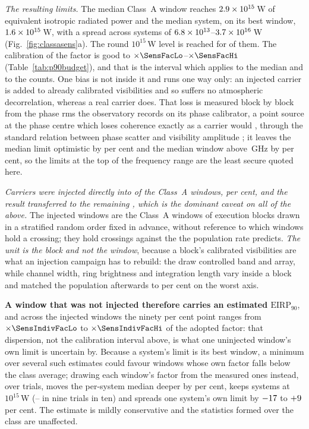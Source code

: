 \emph{The resulting limits.} The median Class~A window reaches
$2.9\times10^{15}$\,W of equivalent isotropic radiated power and the median
system, on its best window, $1.6\times10^{15}$\,W, with a spread across
systems of $6.8\times10^{13}$--$3.7\times10^{16}$\,W
(Fig.~\ref{fig:classasens}a). The round $10^{15}$\,W level is reached for
\NSysEfifteen{} of them. The calibration of the factor is good to
$\times\SensFacLo$--$\times\SensFacHi$ (Table~\ref{tab:p90budget}), and that
is the interval which applies to the median and to the counts. One bias is
not inside it and runs one way only: an injected carrier is added to already calibrated visibilities
and so suffers no atmospheric decorrelation, whereas a real carrier does. That
loss is measured block by block from the phase rms the observatory records on
its phase calibrator, a point source at the phase centre which loses coherence
exactly as a carrier would \citep[\S10.4.9]{ALMAHandbook}, through the standard
relation between phase scatter and visibility amplitude
\citep[Eq.~3]{Richards2022};
it leaves the median limit optimistic by \SensDecorPct{} per cent and the
median window above \SensDecorHiGHz{}\,GHz by \SensDecorHiPct{} per cent, so
the limits at the top of the frequency range are the least secure quoted here.

\emph{Carriers were injected directly into \SensNInj{} of the \NWinA{}
Class~A windows, \SensNInjPct{} per cent, and the result transferred to the
remaining \SensNTransfer, which is the dominant caveat on all of the above.}
The injected windows are the Class~A windows of execution blocks drawn in a
stratified random order fixed in advance, without reference to which windows
hold a crossing; they hold \SensNCrossAch{} crossings against the
\SensNCrossExp{} the population rate predicts. \emph{The unit is the block
and not the window}, because a block's calibrated visibilities are what an
injection campaign has to rebuild: the draw controlled band and array, while
channel width, ring brightness and integration length vary inside a block and
matched the population afterwards to \SensCovWorstPct{} per cent on the worst
axis.

\textbf{A window that was not injected therefore carries an estimated
$\mathrm{EIRP}_{90}$}, and across the injected windows the ninety per cent
point ranges from $\times\SensIndivFacLo$ to $\times\SensIndivFacHi$ of the
adopted factor: that dispersion, not the calibration interval above, is what
one uninjected window's own limit is uncertain by. Because a system's limit is
its best window, a minimum over several such estimates could favour windows
whose own factor falls below the class average; drawing each window's factor
from the \SensNInj{} measured ones instead, over \ScRsNTrial{} trials, moves
the per-system median deeper by \ScRsMedShiftPct{} per cent, keeps
\NSysEfifteen{} systems at $10^{15}$\,W (\ScRsNLo--\ScRsNHi{} in nine trials in
ten) and spreads one system's own limit by $-17$ to
$+9$ per cent. The estimate is mildly conservative and the
statistics formed over the class are unaffected.

